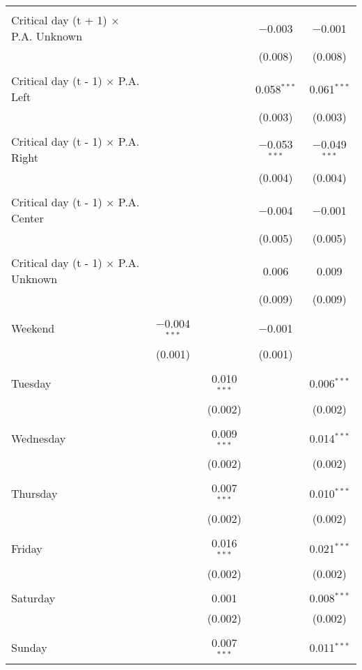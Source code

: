 \documentclass[
]{article}
\begin{document}
\begin{table}[!htbp]
{\begin{tabular}{@{\extracolsep{5pt}}lcccc}
  & & & & \\ 
 Critical day (t + 1) $\times$ P.A. Unknown &  &  & $-$0.003 & $-$0.001 \\ 
  &  &  & (0.008) & (0.008) \\ 
  & & & & \\ 
 Critical day (t - 1) $\times$ P.A. Left &  &  & 0.058$^{***}$ & 0.061$^{***}$ \\ 
  &  &  & (0.003) & (0.003) \\ 
  & & & & \\ 
 Critical day (t - 1) $\times$ P.A. Right &  &  & $-$0.053$^{***}$ & $-$0.049$^{***}$ \\ 
  &  &  & (0.004) & (0.004) \\ 
  & & & & \\ 
 Critical day (t - 1) $\times$ P.A. Center &  &  & $-$0.004 & $-$0.001 \\ 
  &  &  & (0.005) & (0.005) \\ 
  & & & & \\ 
 Critical day (t - 1) $\times$ P.A. Unknown &  &  & 0.006 & 0.009 \\ 
  &  &  & (0.009) & (0.009) \\ 
  & & & & \\ 
 Weekend & $-$0.004$^{***}$ &  & $-$0.001 &  \\ 
  & (0.001) &  & (0.001) &  \\ 
  & & & & \\ 
 Tuesday &  & 0.010$^{***}$ &  & 0.006$^{***}$ \\ 
  &  & (0.002) &  & (0.002) \\ 
  & & & & \\ 
 Wednesday &  & 0.009$^{***}$ &  & 0.014$^{***}$ \\ 
  &  & (0.002) &  & (0.002) \\ 
  & & & & \\ 
 Thursday &  & 0.007$^{***}$ &  & 0.010$^{***}$ \\ 
  &  & (0.002) &  & (0.002) \\ 
  & & & & \\ 
 Friday &  & 0.016$^{***}$ &  & 0.021$^{***}$ \\ 
  &  & (0.002) &  & (0.002) \\ 
  & & & & \\ 
 Saturday &  & 0.001 &  & 0.008$^{***}$ \\ 
  &  & (0.002) &  & (0.002) \\ 
  & & & & \\ 
 Sunday &  & 0.007$^{***}$ &  & 0.011$^{***}$ \\ 

\end{tabular}}
\end{table}
\end{document}
